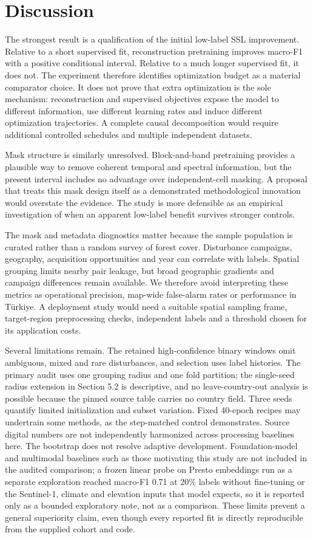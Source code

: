 \documentclass[11pt,a4paper]{article}
\begin{document}
\section{Discussion}
The strongest result is a qualification of the initial low-label SSL improvement. Relative to a short supervised fit, reconstruction pretraining improves macro-F1 with a positive conditional interval. Relative to a much longer supervised fit, it does not. The experiment therefore identifies optimization budget as a material comparator choice. It does not prove that extra optimization is the sole mechanism: reconstruction and supervised objectives expose the model to different information, use different learning rates and induce different optimization trajectories. A complete causal decomposition would require additional controlled schedules and multiple independent datasets.

Mask structure is similarly unresolved. Block-and-band pretraining provides a plausible way to remove coherent temporal and spectral information, but the present interval includes no advantage over independent-cell masking. A proposal that treats this mask design itself as a demonstrated methodological innovation would overstate the evidence. The study is more defensible as an empirical investigation of when an apparent low-label benefit survives stronger controls.

The mask and metadata diagnostics matter because the sample population is curated rather than a random survey of forest cover. Disturbance campaigns, geography, acquisition opportunities and year can correlate with labels. Spatial grouping limits nearby pair leakage, but broad geographic gradients and campaign differences remain available. We therefore avoid interpreting these metrics as operational precision, map-wide false-alarm rates or performance in Türkiye. A deployment study would need a suitable spatial sampling frame, target-region preprocessing checks, independent labels and a threshold chosen for its application costs.

Several limitations remain. The retained high-confidence binary windows omit ambiguous, mixed and rare disturbances, and selection uses label histories. The primary audit uses one grouping radius and one fold partition; the single-seed radius extension in Section 5.2 is descriptive, and no leave-country-out analysis is possible because the pinned source table carries no country field. Three seeds quantify limited initialization and subset variation. Fixed 40-epoch recipes may undertrain some methods, as the step-matched control demonstrates. Source digital numbers are not independently harmonized across processing baselines here. The bootstrap does not resolve adaptive development. Foundation-model and multimodal baselines such as those motivating this study are not included in the audited comparison; a frozen linear probe on Presto embeddings run as a separate exploration reached macro-F1 0.71 at 20\% labels without fine-tuning or the Sentinel-1, climate and elevation inputs that model expects, so it is reported only as a bounded exploratory note, not as a comparison. These limits prevent a general superiority claim, even though every reported fit is directly reproducible from the supplied cohort and code.
\end{document}
